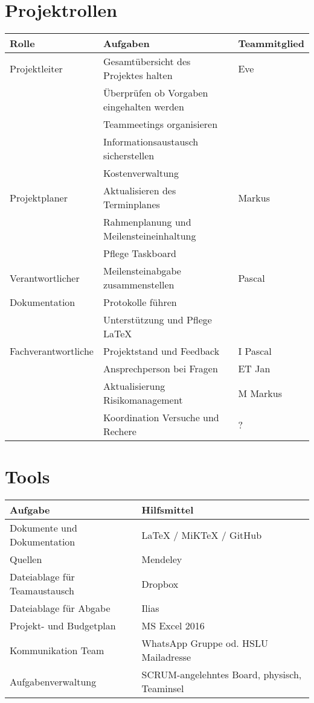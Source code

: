 \documentclass[a4paper]{report}
\begin{document}
\section{Projektrollen}

\begin{tabular}{|l|l|l|}
	\hline 
	\textbf{Rolle} & \textbf{Aufgaben} & \textbf{Teammitglied} \\ 
	\hline 
	Projektleiter & Gesamtübersicht des Projektes halten  & Eve \\
	& Überprüfen ob Vorgaben eingehalten werden & \\
	& Teammeetings organisieren & \\
	& Informationsaustausch sicherstellen & \\
	& Kostenverwaltung & \\ 
	\hline 
	Projektplaner & Aktualisieren des Terminplanes & Markus\\
	& Rahmenplanung und Meilensteineinhaltung & \\
	& Pflege Taskboard & \\ 
	\hline 
	Verantwortlicher& Meilensteinabgabe zusammenstellen & Pascal \\
	Dokumentation& Protokolle führen & \\
	& Unterstützung und Pflege LaTeX &  \\ 
	\hline 
	Fachverantwortliche & Projektstand und Feedback & I Pascal \\
	& Ansprechperson bei Fragen & ET Jan\\
	& Aktualisierung Risikomanagement & M Markus\\
	& Koordination Versuche und Rechere & ?\\ 
	\hline 
\end{tabular} 

\section{Tools}
\begin{tabular}{|l|l|}
	\hline 
	\textbf{Aufgabe} & \textbf{Hilfsmittel} \\ 
	\hline 
	Dokumente und Dokumentation & LaTeX / MiKTeX / GitHub \\
	\hline
	Quellen & Mendeley \\
	\hline
	Dateiablage für Teamaustausch & Dropbox \\
	\hline
	Dateiablage für Abgabe & Ilias \\
	\hline
	Projekt- und Budgetplan & MS Excel 2016 \\
	\hline
	Kommunikation Team & WhatsApp Gruppe od. HSLU Mailadresse\\
	\hline
	Aufgabenverwaltung & SCRUM-angelehntes Board, physisch, Teaminsel\\
	\hline
\end{tabular}
\end{document}
